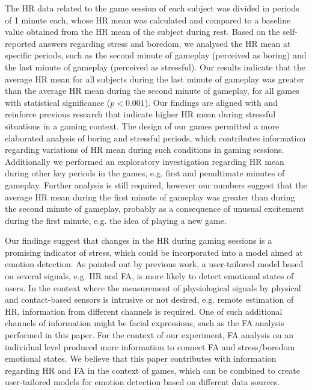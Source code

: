 The HR data related to the game session of each subject was divided in periods of 1 minute each, whose HR mean was calculated and compared to a baseline value obtained from the HR mean of the subject during rest. Based on the self-reported answers regarding stress and boredom, we analysed the HR mean at specific periods, such as the second minute of gameplay (perceived as boring) and the last minute of gameplay (perceived as stressful). Our results indicate that the average HR mean for all subjects during the last minute of gameplay was greater than the average HR mean during the second minute of gameplay, for all games with statistical significance ($p<0.001$). Our findings are aligned with and reinforce previous research that indicate higher HR mean during stressful situations in a gaming context. The design of our games permitted a more elaborated analysis of boring and stressful periods, which contributes information regarding variations of HR mean during such conditions in gaming sessions. Additionally we performed an exploratory investigation regarding HR mean during other key periods in the games, e.g. first and penultimate minutes of gameplay. Further analysis is still required, however our numbers suggest that the average HR mean during the first minute of gameplay was greater than during the second minute of gameplay, probably as a consequence of unusual excitement during the first minute, e.g. the idea of playing a new game.

Our findings suggest that changes in the HR during gaming sessions is a promising indicator of stress, which could be incorporated into a model aimed at emotion detection. As pointed out by previous work, a user-tailored model based on several signals, e.g. HR and FA, is more likely to detect emotional states of users. In the context where the measurement of physiological signals by physical and contact-based sensors is intrusive or not desired, e.g. remote estimation of HR, information from different channels is required. One of such additional channels of information might be facial expressions, such as the FA analysis performed in this paper. For the context of our experiment, FA analysis on an individual level produced more information to connect FA and stress/boredom emotional states. We believe that this paper contributes with information regarding HR and FA in the context of games, which can be combined to create user-tailored models for emotion detection based on different data sources.
